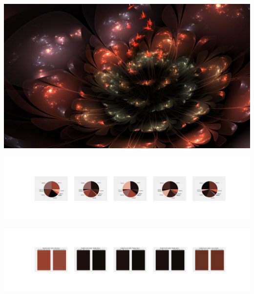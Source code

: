 \documentclass[11pt]{article}
\begin{document}
\begin{landscape}
    \begin{center}
    \includegraphics[width=\textwidth]{./nbimg/file (44).jpg}
    \end{center}

    \begin{center}
    \includegraphics[width=250mm]{./nbimg/pie-378.jpg}
    \end{center}

    \begin{center}
    \includegraphics[width=250mm]{./nbimg/peak-378.jpg}
    \end{center}
    


\end{landscape}
\end{document}
